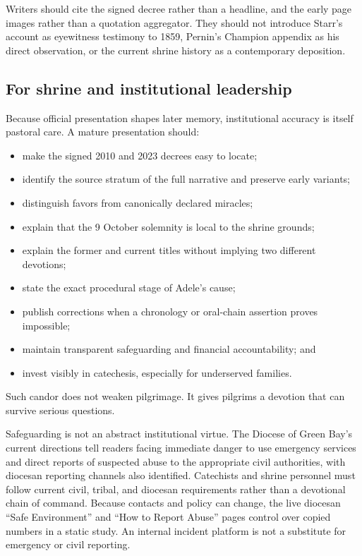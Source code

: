 Writers should cite the signed decree rather than a headline, and the early page images rather than a quotation aggregator. They should not introduce Starr's account as eyewitness testimony to 1859, Pernin's Champion appendix as his direct observation, or the current shrine history as a contemporary deposition.

\subsection{For shrine and institutional leadership}

Because official presentation shapes later memory, institutional accuracy is itself pastoral care. A mature presentation should:

\begin{itemize}
  \item make the signed 2010 and 2023 decrees easy to locate;
  \item identify the source stratum of the full narrative and preserve early variants;
  \item distinguish favors from canonically declared miracles;
  \item explain that the 9 October solemnity is local to the shrine grounds;
  \item explain the former and current titles without implying two different devotions;
  \item state the exact procedural stage of Adele's cause;
  \item publish corrections when a chronology or oral-chain assertion proves impossible;
  \item maintain transparent safeguarding and financial accountability; and
  \item invest visibly in catechesis, especially for underserved families.
\end{itemize}

Such candor does not weaken pilgrimage. It gives pilgrims a devotion that can survive serious questions.

Safeguarding is not an abstract institutional virtue. The Diocese of Green Bay's current directions tell readers facing immediate danger to use emergency services and direct reports of suspected abuse to the appropriate civil authorities, with diocesan reporting channels also identified. Catechists and shrine personnel must follow current civil, tribal, and diocesan requirements rather than a devotional chain of command. Because contacts and policy can change, the live diocesan “Safe Environment” and “How to Report Abuse” pages control over copied numbers in a static study. An internal incident platform is not a substitute for emergency or civil reporting.

